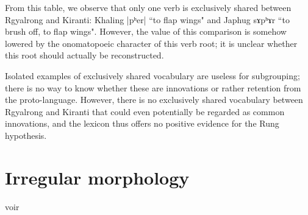 \documentclass[oldfontcommands,oneside,a4paper,11pt]{article}
\newcommand{\ipa}[1]{{\phon #1}} %
\begin{document}
From this table, we observe that only one verb is exclusively shared between Rgyalrong and Kiranti: Khaling |pʰer| ``to flap wings" and Japhug \ipa{sɤpʰɤr} ``to brush off, to flap wings". However, the value of this comparison is somehow lowered by the 
onomatopoeic character of this verb root; it is unclear whether this root should actually be reconstructed.  
 

Isolated examples of exclusively shared vocabulary are useless for subgrouping; there is no way to know whether these are innovations or rather retention from the proto-language. However, there is no exclusively shared vocabulary between Rgyalrong and Kiranti that could even potentially be regarded as common innovations, and the lexicon thus offers no positive evidence for the Rung hypothesis.

\section{Irregular morphology}



 voir \citet{meillet75}  \citet{schindler72apophonie} 




 




\end{document}
